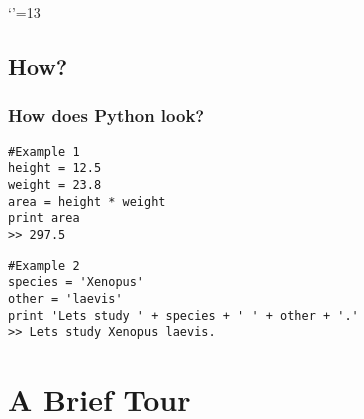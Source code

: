 \documentclass{beamer}
\begin{document}
\makeatletter
\let \@sverbatim \@verbatim
\def \@verbatim {\@sverbatim \verbatimplus}
{\catcode`'=13 \gdef \verbatimplus{\catcode`'=13 \chardef '=13 }} 
\makeatother



\subsection{How?}
\begin{frame}[fragile]
  \frametitle{How does Python look?}

  \small

\begin{verbatim}
#Example 1
height = 12.5
weight = 23.8
area = height * weight
print area
>> 297.5
\end{verbatim}

\begin{verbatim}
#Example 2
species = 'Xenopus'
other = 'laevis'
print 'Lets study ' + species + ' ' + other + '.'
>> Lets study Xenopus laevis.
\end{verbatim}


\end{frame}



\section{A Brief Tour}
\end{document}
